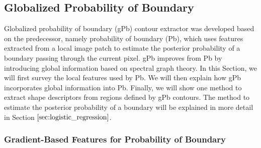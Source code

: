 \documentclass{SMBV12}
\begin{document}
\subsection{Globalized Probability of Boundary}
\label{sec:shape_feature}

Globalized probability of boundary (gPb) contour extractor was developed based on the predecessor, namely probability of boundary (Pb), which uses features extracted from a local image patch to estimate the posterior probability of a boundary passing through the current pixel. gPb improves from Pb by introducing global information based on spectral graph theory. In this Section, we will first survey the local features used by Pb. We will then explain how gPb incorporates global information into Pb. Finally, we will show one method to extract shape descriptors from regions defined by gPb contours. The method to estimate the posterior probability of a boundary will be explained in more detail in Section $\ref{sec:logistic_regression}$.

\subsubsection{Gradient-Based Features for Probability of Boundary}
\label{sec:textons}
\end{document}
